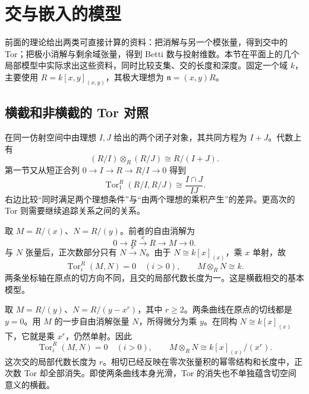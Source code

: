 
% 
% 
% 

\section{交与嵌入的模型}
\label{g5:sec:0805}

前面的理论给出两类可直接计算的资料：把消解与另一个模张量，得到交中的 Tor；把极小消解与剩余域张量，得到 Betti 数与投射维数。本节在平面上的几个局部模型中实际求出这些资料，同时比较支集、交的长度和深度。固定一个域 \(k\)，主要使用
\(R=k[x,y]_{(x,y)}\)，其极大理想为 \(\mathfrak n=(x,y)R\)。

\subsection{横截和非横截的 Tor 对照}
\label{g5:subsec:0805:01}

在同一仿射空间中由理想 \(I,J\) 给出的两个闭子对象，其共同方程为 \(I+J\)。代数上有
\[
	(R/I)\otimes_R(R/J)\cong R/(I+J).
\]
第一节又从短正合列 \(0\to I\to R\to R/I\to0\) 得到
\[
	\operatorname{Tor}_1^R(R/I,R/J)
	\cong\frac{I\cap J}{IJ}.
\]
右边比较“同时满足两个理想条件”与“由两个理想的乘积产生”的差异。更高次的 Tor 则需要继续追踪关系之间的关系。

\begin{example}\label{g5:exm:transverse-axis-tor}
	取 \(M=R/(x)\)、\(N=R/(y)\)。前者的自由消解为
	\[
		0\longrightarrow R\xrightarrow{x}R\longrightarrow M\longrightarrow0.
	\]
	与 \(N\) 张量后，正次数部分只有 \(N\xrightarrow{x}N\)。由于
	\(N\cong k[x]_{(x)}\)，乘 \(x\) 单射，故
	\[
		\operatorname{Tor}_i^R(M,N)=0\quad(i>0),\qquad
		M\otimes_RN\cong k.
	\]
	两条坐标轴在原点的切方向不同，且交的局部代数长度为一。这是横截相交的基本模型。
\end{example}

\begin{example}\label{g5:exm:tangent-curves-tor}
	取 \(M=R/(y)\)、\(N=R/(y-x^r)\)，其中 \(r\geq2\)。两条曲线在原点的切线都是 \(y=0\)。用 \(M\) 的一步自由消解张量 \(N\)，所得微分为乘 \(y\)。在同构 \(N\cong k[x]_{(x)}\) 下，它就是乘 \(x^r\)，仍然单射。因此
	\[
		\operatorname{Tor}_i^R(M,N)=0\quad(i>0),\qquad
		M\otimes_RN\cong k[x]_{(x)}/(x^r).
	\]
	这次交的局部代数长度为 \(r\)。相切已经反映在零次张量积的幂零结构和长度中，正次数 Tor 却全部消失。即使两条曲线本身光滑，Tor 的消失也不单独蕴含切空间意义的横截。
\end{example}

